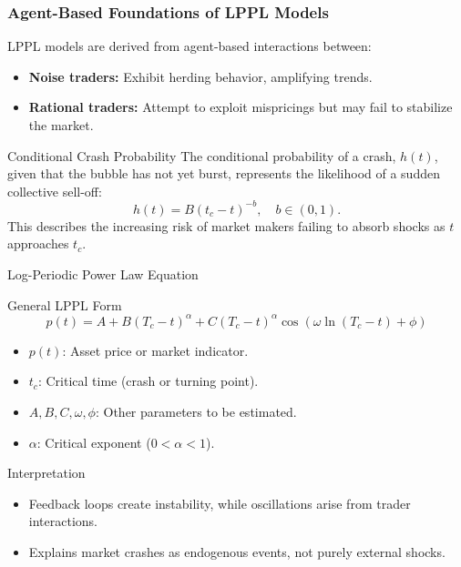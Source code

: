 \documentclass{beamer}
\begin{document}
\begin{frame}
    \frametitle{Agent-Based Foundations of LPPL Models}
    {LPPL models are derived from agent-based interactions between:}
    \begin{itemize}
        \item \textbf{Noise traders:} Exhibit herding behavior, amplifying trends.
        \item \textbf{Rational traders:} Attempt to exploit mispricings but may fail to stabilize the market.
    \end{itemize}
    \begin{block}{Conditional Crash Probability}
        The conditional probability of a crash, \(h(t)\), given that the bubble has not yet burst, represents the likelihood of a sudden collective sell-off:
        \[
        h(t) = B (t_c - t)^{-b}, \quad b \in (0, 1).
        \]
        This describes the increasing risk of market makers failing to absorb shocks as \(t\) approaches \(t_c\).
    \end{block}
\end{frame}

\begin{frame}{Log-Periodic Power Law Equation}
    \begin{block}{General LPPL Form}
        \[p(t) = A + B (T_c - t)^{\alpha} + C (T_c - t)^{\alpha} \cos \left(\omega \ln (T_c - t) + \phi\right)
        \]
        \begin{itemize}
            \item \(p(t)\): Asset price or market indicator.
            \item \(t_c\): Critical time (crash or turning point).
            \item \(A, B, C, \omega, \phi\): Other parameters to be estimated.
            \item \(\alpha\): Critical exponent (\(0 < \alpha < 1\)).
        \end{itemize}
    \end{block}
    {Interpretation}
        \begin{itemize}
            \item Feedback loops create instability, while oscillations arise from trader interactions.
            \item Explains market crashes as endogenous events, not purely external shocks.
        \end{itemize}
\end{frame}
\end{document}
